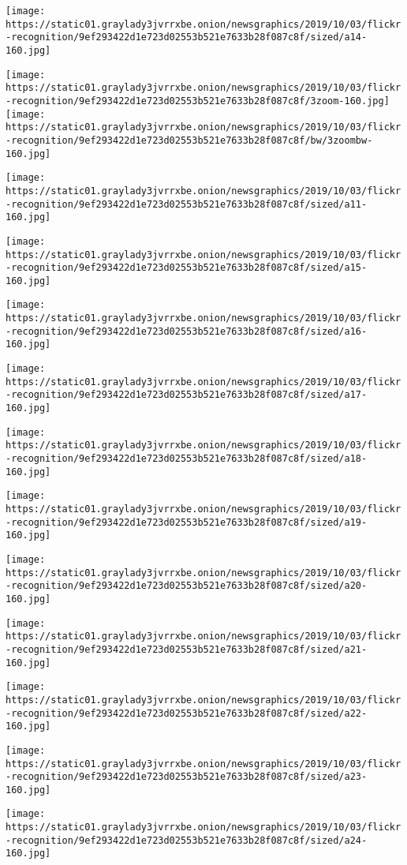 \texttt{[image: https://static01.graylady3jvrrxbe.onion/newsgraphics/2019/10/03/flickr-recognition/9ef293422d1e723d02553b521e7633b28f087c8f/sized/a14-160.jpg]}

\texttt{[image: https://static01.graylady3jvrrxbe.onion/newsgraphics/2019/10/03/flickr-recognition/9ef293422d1e723d02553b521e7633b28f087c8f/3zoom-160.jpg]}\texttt{[image: https://static01.graylady3jvrrxbe.onion/newsgraphics/2019/10/03/flickr-recognition/9ef293422d1e723d02553b521e7633b28f087c8f/bw/3zoombw-160.jpg]}

\texttt{[image: https://static01.graylady3jvrrxbe.onion/newsgraphics/2019/10/03/flickr-recognition/9ef293422d1e723d02553b521e7633b28f087c8f/sized/a11-160.jpg]}

\texttt{[image: https://static01.graylady3jvrrxbe.onion/newsgraphics/2019/10/03/flickr-recognition/9ef293422d1e723d02553b521e7633b28f087c8f/sized/a15-160.jpg]}

\texttt{[image: https://static01.graylady3jvrrxbe.onion/newsgraphics/2019/10/03/flickr-recognition/9ef293422d1e723d02553b521e7633b28f087c8f/sized/a16-160.jpg]}

\texttt{[image: https://static01.graylady3jvrrxbe.onion/newsgraphics/2019/10/03/flickr-recognition/9ef293422d1e723d02553b521e7633b28f087c8f/sized/a17-160.jpg]}

\texttt{[image: https://static01.graylady3jvrrxbe.onion/newsgraphics/2019/10/03/flickr-recognition/9ef293422d1e723d02553b521e7633b28f087c8f/sized/a18-160.jpg]}

\texttt{[image: https://static01.graylady3jvrrxbe.onion/newsgraphics/2019/10/03/flickr-recognition/9ef293422d1e723d02553b521e7633b28f087c8f/sized/a19-160.jpg]}

\texttt{[image: https://static01.graylady3jvrrxbe.onion/newsgraphics/2019/10/03/flickr-recognition/9ef293422d1e723d02553b521e7633b28f087c8f/sized/a20-160.jpg]}

\texttt{[image: https://static01.graylady3jvrrxbe.onion/newsgraphics/2019/10/03/flickr-recognition/9ef293422d1e723d02553b521e7633b28f087c8f/sized/a21-160.jpg]}

\texttt{[image: https://static01.graylady3jvrrxbe.onion/newsgraphics/2019/10/03/flickr-recognition/9ef293422d1e723d02553b521e7633b28f087c8f/sized/a22-160.jpg]}

\texttt{[image: https://static01.graylady3jvrrxbe.onion/newsgraphics/2019/10/03/flickr-recognition/9ef293422d1e723d02553b521e7633b28f087c8f/sized/a23-160.jpg]}

\texttt{[image: https://static01.graylady3jvrrxbe.onion/newsgraphics/2019/10/03/flickr-recognition/9ef293422d1e723d02553b521e7633b28f087c8f/sized/a24-160.jpg]}

